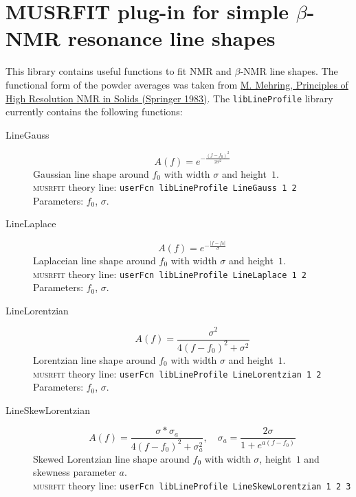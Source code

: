 \documentclass[twoside]{article}
\newcommand{\musrfithead}{MUSRFIT\xspace}
\newcommand{\musrfit}{\textsc{musrfit}\xspace}
\begin{document}
\section*{\musrfithead plug-in for simple $\beta$-NMR resonance line shapes}%
This library contains useful functions to fit NMR and $\beta$-NMR line shapes. 
The functional form of the powder averages was taken from 
\href{http://dx.doi.org/10.1007/978-3-642-68756-3_2}{M. Mehring, Principles 
of High Resolution NMR in Solids (Springer 1983)}.
%
The \texttt{libLineProfile} library currently contains the following functions:
\begin{description}
 \item[LineGauss]
   \begin{equation}
    A(f)=e^{-\frac{(f-f_0)^2}{2 \sigma^2}}
   \end{equation}
   Gaussian line shape around $f_0$ with width $\sigma$ and height~$1$.\\[1.5ex]
   \musrfit theory line: \verb?userFcn libLineProfile LineGauss 1 2?\\[1.5ex]
    Parameters: $f_0$, $\sigma$. 
 \item[LineLaplace]
   \begin{equation}
    A(f)=e^{-\frac{|f-f_0|}{\sigma}}
   \end{equation}
   Laplaceian line shape around $f_0$ with width $\sigma$ and 
height~$1$.\\[1.5ex]
   \musrfit theory line: \verb?userFcn libLineProfile LineLaplace 1 2?
\\[1.5ex]
    Parameters: $f_0$, $\sigma$. 
     \item[LineLorentzian]
   \begin{equation}
    A(f)= 
\frac{\sigma^2}{4(f-f_0)^2+\sigma^2}
   \end{equation}
   Lorentzian line shape around $f_0$ with width $\sigma$ and 
height~$1$.\\[1.5ex]
   \musrfit theory line: \verb?userFcn libLineProfile LineLorentzian 1 2?
\\[1.5ex]
    Parameters: $f_0$, $\sigma$.
    \item[LineSkewLorentzian]
   \begin{equation}
    A(f)=  \frac{\sigma*\sigma_a}{4(f-f_0)^2+\sigma_a^2}, \quad \sigma_a=\frac{2\sigma}{1+e^{a(f-f_0)}}
   \end{equation}
   Skewed Lorentzian line shape around $f_0$ with width $\sigma$, 
height~$1$ and skewness parameter $a$.\\[1.5ex]
   \musrfit theory line: \verb?userFcn libLineProfile LineSkewLorentzian 1 2 3?

\end{description}
\end{document}
